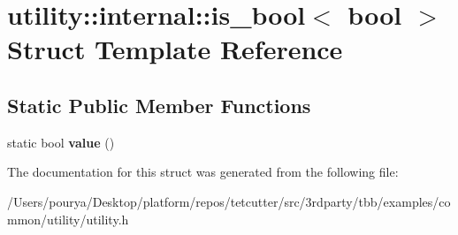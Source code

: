 \hypertarget{structutility_1_1internal_1_1is__bool_3_01bool_01_4}{}\section{utility\+:\+:internal\+:\+:is\+\_\+bool$<$ bool $>$ Struct Template Reference}
\label{structutility_1_1internal_1_1is__bool_3_01bool_01_4}
\subsection*{Static Public Member Functions}
\begin{DoxyCompactItemize}
\item 
\hypertarget{structutility_1_1internal_1_1is__bool_3_01bool_01_4_a0eb8ddbf2d2254cb16c69d23791c11ed}{}static bool {\bfseries value} ()\label{structutility_1_1internal_1_1is__bool_3_01bool_01_4_a0eb8ddbf2d2254cb16c69d23791c11ed}

\end{DoxyCompactItemize}


The documentation for this struct was generated from the following file\+:\begin{DoxyCompactItemize}
\item 
/\+Users/pourya/\+Desktop/platform/repos/tetcutter/src/3rdparty/tbb/examples/common/utility/utility.\+h\end{DoxyCompactItemize}
